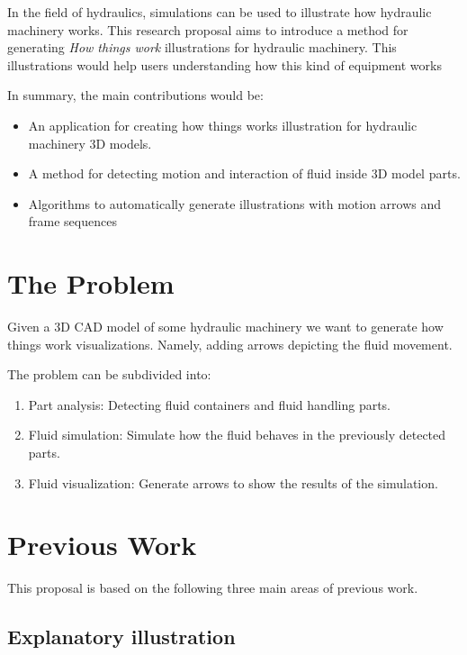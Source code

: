 \documentclass[11pt]{report}
\begin{document}
In the field of hydraulics, simulations can be used to illustrate how hydraulic machinery works.
This research proposal aims to introduce a method for generating \textit{How things work} illustrations for hydraulic machinery.
This illustrations would help users understanding how this kind of equipment works

In summary, the main contributions would be:
\begin{itemize}
\item An application for creating how things works illustration for hydraulic machinery 3D models.
\item A method for detecting motion and interaction of fluid inside 3D model parts.
\item Algorithms to automatically generate illustrations with motion arrows and frame sequences
\end{itemize}


\section{The Problem}
\label{sec:problem}

Given a 3D CAD model of some hydraulic machinery we want to generate how things work visualizations.
Namely, adding arrows depicting the fluid movement.

The problem can be subdivided into:
\begin{enumerate}
\item Part analysis: Detecting fluid containers and fluid handling parts.
\item Fluid simulation: Simulate how the fluid behaves in the previously detected parts.
\item Fluid visualization: Generate arrows to show the results of the simulation. 
\end{enumerate}

\section{Previous Work}

This proposal is based on the following three main areas of previous work.

\subsection{Explanatory illustration}
\end{document}

